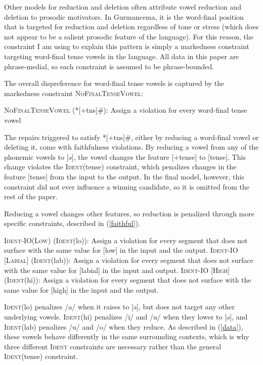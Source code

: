 \documentclass[output=paper,newtxmath,modfonts,nonflat,draftmode]{langsci/langscibook}
\begin{document}
Other models for reduction and deletion often attribute vowel reduction and deletion to prosodic motivators. In Gurmancema, it is the word-final position that is targeted for reduction and deletion regardless of tone or stress (which does not appear to be a salient prosodic feature of the language). For this reason, the constraint I am using to explain this pattern is simply a markedness constraint targeting word-final tense vowels in the language. All data in this paper are phrase-medial, so each constraint is assumed to be phrase-bounded. 

The overall dispreference for word-final tense vowels is captured by the 
mar\-kedness constraint \textsc{NoFinalTenseVowel}:

\ea
\textsc{NoFinalTenseVowel} (*[+tns]\#): Assign a violation for every word-final tense vowel
\z

The repairs triggered to satisfy *[+tns]\#, either by reducing a word-final vowel or deleting it, come with faithfulness violations. By reducing a vowel from any of the phonemic vowels to [ə], the vowel changes the feature [+tense] to [\textminus tense]. This change violates the \textsc{Ident}(tense) constraint, which penalizes changes in the feature [tense] from the input to the output. In the final model, however, this constraint did not ever influence a winning candidate, so it is omitted from the rest of the paper.

Reducing a vowel changes other features, so reduction is penalized through more specific constraints, described in 
(\ref{faithful}).


\ea \label{faithful}
\ea \textsc{Ident-IO(Low)} (\textsc{Ident}(lo)): Assign a violation for every segment that does not surface with the same value for [low] in the input and the output.
\ex \textsc{Ident-IO [Labial]} (\textsc{Ident}(lab)): Assign a violation for every segment that does not surface with the same value for [labial] in the input and output.
\ex \textsc{Ident-IO [High]} (\textsc{Ident}(hi)):  Assign a violation for every segment that does not surface with the same value for [high] in the input and the output. 
\z
\z 

\textsc{Ident}(lo) penalizes /a/ when it raises to [ə], but does not target any other underlying vowels. \textsc{Ident}(hi) penalizes /i/ and /u/ when they lower to [ə], and \textsc{Ident}(lab) penalizes /u/ and /o/ when they reduce. As described in (\ref{data}), these vowels behave differently in the same surrounding contexts, which is why three different \textsc{Ident} constraints are necessary rather than the general \textsc{Ident}(tense) constraint. 
 
\end{document}
